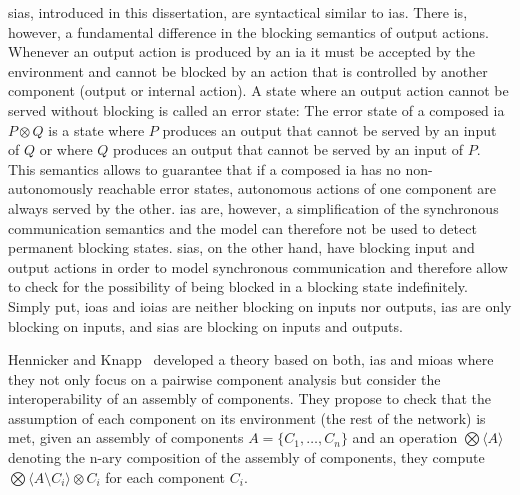 \Glspl{sia}, introduced in this dissertation, are syntactical similar to \glspl{ia}.
There is, however, a fundamental difference in the blocking semantics of output actions.
Whenever an output action is produced by an \gls{ia} it must be accepted by the environment and cannot be blocked by an action that is controlled by another component (output or internal action).
A state where an output action cannot be served without blocking is called an error state:
The error state of a composed \gls{ia} $P \otimes Q$ is a state where $P$ produces an output that cannot be served by an input of $Q$ or where $Q$ produces an output that cannot be served by an input of $P$.
This semantics allows to guarantee that if a composed \gls{ia} has no non-autonomously reachable error states, autonomous actions of one component are always served by the other.
\Glspl{ia} are, however, a simplification of the synchronous communication semantics and the model can therefore not be used to detect permanent blocking states.
\Glspl{sia}, on the other hand, have blocking input and output actions in order to model synchronous communication and therefore allow to check for the possibility of being blocked in a blocking state indefinitely.
Simply put, \glspl{ioa} and \glspl{ioia} are neither blocking on inputs nor outputs, \glspl{ia} are only blocking on inputs, and \glspl{sia} are blocking on inputs and outputs.

Hennicker and Knapp~\cite{hennicker2015} developed a theory based on both, \glspl{ia} and \glspl{mioa} where they not only focus on a pairwise component analysis but consider the interoperability of an assembly of components.
They propose to check that the assumption of each component on its environment (the rest of the network) is met, \ie given an assembly of components $A = \{ C_1, \dots, C_n \}$ and an operation $\bigotimes\langle A \rangle$ denoting the n-ary composition of the assembly of components, they compute $\bigotimes\langle A \setminus C_i \rangle \otimes C_i$ for each component $C_i$.

